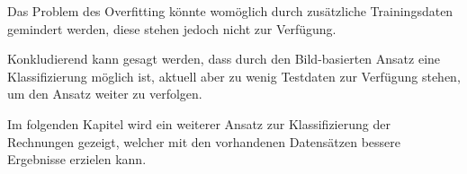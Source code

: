 Das Problem des Overfitting könnte womöglich durch zusätzliche Trainingsdaten gemindert werden, diese stehen jedoch nicht zur Verfügung.

Konkludierend kann gesagt werden, dass durch den Bild-basierten Ansatz eine Klassifizierung möglich ist, aktuell aber zu wenig Testdaten zur Verfügung stehen, um den Ansatz weiter zu verfolgen.

Im folgenden Kapitel wird ein weiterer Ansatz zur Klassifizierung der Rechnungen gezeigt, welcher mit den vorhandenen Datensätzen bessere Ergebnisse erzielen kann.







